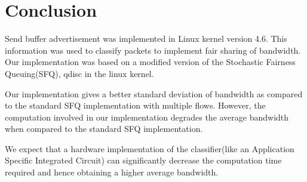 \chapter{Conclusion}

Send buffer advertisement was implemented in Linux kernel version 4.6. This
information was used to classify packets to implement fair sharing of
bandwidth. Our implementation was based on a modified version of the Stochastic
Fairness Queuing(SFQ), qdisc in the linux kernel.

Our implementation gives a better standard deviation of bandwidth as compared to
the standard SFQ implementation with multiple flows. However, the computation
involved in our implementation degrades the average bandwidth when compared to
the standard SFQ implementation.

We expect that a hardware implementation of the classifier(like an Application
Specific Integrated Circuit) can significantly
decrease the computation time required and hence obtaining a higher average
bandwidth.
